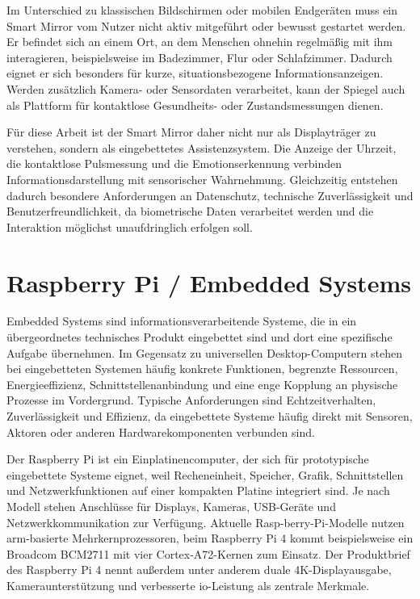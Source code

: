 Im Unterschied zu klassischen Bildschirmen oder mobilen Endgeräten muss ein Smart Mirror vom Nutzer nicht aktiv mitgeführt oder bewusst gestartet werden. Er befindet sich an einem Ort, an dem Menschen ohnehin regelmäßig mit ihm interagieren, beispielsweise im Badezimmer, Flur oder Schlafzimmer. Dadurch eignet er sich besonders für kurze, situationsbezogene Informationsanzeigen. Werden zusätzlich Kamera- oder Sensordaten verarbeitet, kann der Spiegel auch als Plattform für kontaktlose Gesundheits- oder Zustandsmessungen dienen.

Für diese Arbeit ist der Smart Mirror daher nicht nur als Displayträger zu verstehen, sondern als eingebettetes Assistenzsystem. Die Anzeige der Uhrzeit, die kontaktlose Pulsmessung und die Emotionserkennung verbinden Informationsdarstellung mit sensorischer Wahrnehmung. Gleichzeitig entstehen dadurch besondere Anforderungen an Datenschutz, technische Zuverlässigkeit und Benutzerfreundlichkeit, da biometrische Daten verarbeitet werden und die Interaktion möglichst unaufdringlich erfolgen soll.


\section{Raspberry Pi / Embedded Systems}
Embedded Systems sind informationsverarbeitende Systeme, die in ein übergeordnetes technisches Produkt eingebettet sind und dort eine spezifische Aufgabe übernehmen. Im Gegensatz zu universellen Desktop-Computern stehen bei eingebetteten Systemen häufig konkrete Funktionen, begrenzte Ressourcen, Energieeffizienz, Schnittstellenanbindung und eine enge Kopplung an physische Prozesse im Vordergrund. Typische Anforderungen sind Echtzeitverhalten, Zuverlässigkeit und Effizienz, da eingebettete Systeme häufig direkt mit Sensoren, Aktoren oder anderen Hardwarekomponenten verbunden sind.

Der Raspberry Pi ist ein Einplatinencomputer, der sich für prototypische eingebettete Systeme eignet, weil Recheneinheit, Speicher, Grafik, Schnittstellen und Netzwerkfunktionen auf einer kompakten Platine integriert sind. Je nach Modell stehen Anschlüsse für Displays, Kameras, USB-Geräte und Netzwerkkommunikation zur Verfügung. Aktuelle Rasp-\allowbreak berry-Pi-Modelle nutzen \ac{arm}-basierte Mehrkernprozessoren, beim Raspberry Pi 4 kommt beispielsweise ein Broadcom BCM2711 mit vier Cortex-A72-Kernen zum Einsatz. Der Produktbrief des Raspberry Pi 4 nennt außerdem unter anderem duale 4K-Displayausgabe, Kameraunterstützung und verbesserte \ac{io}-Leistung als zentrale Merkmale.

